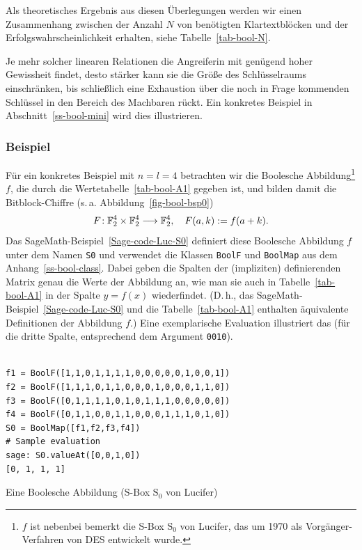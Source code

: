 \begin{refsegment}
Als theoretisches Ergebnis aus diesen Überlegungen
werden wir einen Zusammenhang zwischen der Anzahl $N$ von
benötigten Klartextblöcken und der Erfolgswahrscheinlichkeit erhalten,
siehe Tabelle~\ref{tab-bool-N}.

Je mehr solcher linearen Relationen die Angreiferin mit genügend hoher
Gewissheit findet, desto stärker kann sie die Größe des Schlüsselraums
einschränken, bis schließlich eine Exhaustion über die noch in Frage
kommenden Schlüssel in den Bereich des Machbaren rückt. Ein konkretes
Beispiel in Abschnitt~\ref{ss-bool-mini} wird dies illustrieren.

\subsubsection*{Beispiel}

Für ein konkretes Beispiel mit $n = l = 4$ betrachten wir die
Boolesche Abbildung\footnote{%
   $f$ ist nebenbei bemerkt die S-Box $\mathrm{S}_0$
   von {\sc Lucifer},
   das um 1970 als Vorgänger-Verfahren von DES entwickelt wurde.
} $f$, die durch die Wertetabelle~\ref{tab-bool-A1}
gegeben ist, und bilden damit die Bitblock-Chiffre
(s.\,a. Abbildung~\ref{fig-bool-bsp0})
\[
    F\!: \mathbb{F}_2^4 \times \mathbb{F}_2^4 \longrightarrow \mathbb{F}_2^4, \quad
    F(a,k) := f(a + k).
\]
Das SageMath-Beispiel~\ref{Sage-code-Luc-S0} definiert diese Boolesche
Abbildung $f$ unter dem Namen {\tt S0}
und verwendet die Klassen {\tt BoolF} und {\tt BoolMap} aus dem
Anhang~\ref{ss-bool-class}. Dabei geben die Spalten der (impliziten)
definierenden Matrix genau die Werte der Abbildung an, wie man sie auch
in Tabelle~\ref{tab-bool-A1} in der Spalte $y = f(x)$ wiederfindet.
(D.\,h., das SageMath-Beispiel~\ref{Sage-code-Luc-S0} und die
Tabelle~\ref{tab-bool-A1} enthalten äquivalente Definitionen der
Abbildung $f$.)
Eine exemplarische Evaluation illustriert das (für die dritte Spalte,
entsprechend dem Argument {\tt 0010}).

\begin{sagecode}
\begin{verbatim}

f1 = BoolF([1,1,0,1,1,1,1,0,0,0,0,0,1,0,0,1])
f2 = BoolF([1,1,1,0,1,1,0,0,0,1,0,0,0,1,1,0])
f3 = BoolF([0,1,1,1,1,0,1,0,1,1,1,0,0,0,0,0])
f4 = BoolF([0,1,1,0,0,1,1,0,0,0,1,1,1,0,1,0])
S0 = BoolMap([f1,f2,f3,f4])
# Sample evaluation
sage: S0.valueAt([0,0,1,0])
[0, 1, 1, 1]
\end{verbatim}
\caption{Eine Boolesche Abbildung (S-Box $\mathrm{S}_0$ von
   {\sc Lucifer})}\label{Sage-code-Luc-S0}
\end{sagecode}


\end{refsegment}
